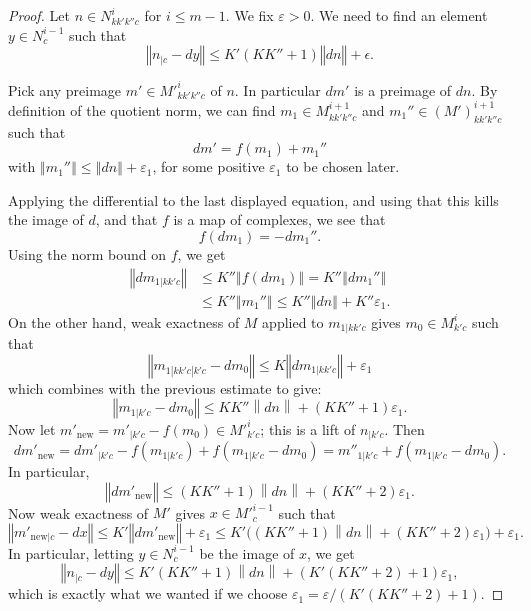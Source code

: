 \begin{proof}
\leanok
\def\ndn{\left\|dn\right\|}
Let $n \in N^i_{kk'k''c}$ for $i\leq m-1$.
We fix $ε > 0$. We need to find an element $y \in N^{i-1}_c$ such that
\[
  ‖n_{|c} - dy‖ \leq K'(KK'' + 1)‖dn‖ + \epsilon.
\]

Pick any preimage $m' \in M'^i_{kk'k''c}$ of $n$. In particular $dm'$ is
a preimage of $dn$.
By definition of the quotient norm,
we can find $m_1 ∈ M^{i+1}_{kk'k''c}$ and $m_1'' ∈ (M')^{i+1}_{kk'k''c}$ such that
\[
dm' = f(m_1) + m_1''
\]
with $‖m_1''‖ \leq ‖dn‖ + ε_1$, for some positive $ε_1$ to be chosen later.

Applying the differential to the last displayed equation, and using that this
kills the image of $d$, and that $f$ is a map of complexes, we see that
\[
f(dm_1) = -dm_1''.
\]
Using the norm bound on $f$, we get
\[\begin{aligned}
  ‖dm_{1|kk'c}‖ &≤ K''‖f(dm_1)‖ = K''‖dm_1''‖\\
                &≤ K''‖m_1''‖ ≤ K''‖dn‖ + K''ε_1.
\end{aligned}\]
On the other hand, weak exactness of $M$ applied to $m_{1|kk'c}$
gives $m_0 ∈ M^i_{k'c}$ such that
\[
  ‖m_{1|kk'c|k'c} - dm_0‖ \leq K‖dm_{1|kk'c}‖ + ε_1
\]
which combines with the previous estimate to give:
\[
  ‖m_{1|k'c} - dm_0‖ \leq K K'' \left\|d n\right\| + (KK'' + 1)ε_1.
\]
Now let $m'_{\mathrm{new}} = m'_{|k'c} - f(m_0) \in M'^i_{k'c}$; this is a lift of $n_{|k'c}$.
Then
\[
dm'_{\mathrm{new}} = dm'_{|k'c} - f(m_{1|k'c}) + f(m_{1|k'c} - dm_0) = m''_{1|k'c} + f(m_{1|k'c} - dm_0).
\]
In particular,
\[
‖dm'_{\mathrm{new}}‖ ≤ (KK'' + 1)\ndn + (KK'' + 2) ε_1.
\]
Now weak exactness of $M'$ gives $x \in M'^{i-1}_c$ such that
\[
  ‖m'_{\mathrm{new}|c} - dx‖ ≤ K'‖dm'_{\mathrm{new}}‖ + ε_1 \leq
    K'\bigl((K K'' + 1) \ndn + (KK'' + 2) ε_1\bigr) + ε_1.
\]
In particular, letting $y \in N^{i-1}_c$ be the image of $x$, we get
\[
  ‖n_{|c} - dy‖ ≤ K'(K K'' + 1)\ndn + (K'(K  K'' + 2) + 1) ε_1,
\]
which is exactly what we wanted if we choose
$ε_1 = ε/(K'(K  K'' + 2) + 1)$.
\end{proof}

